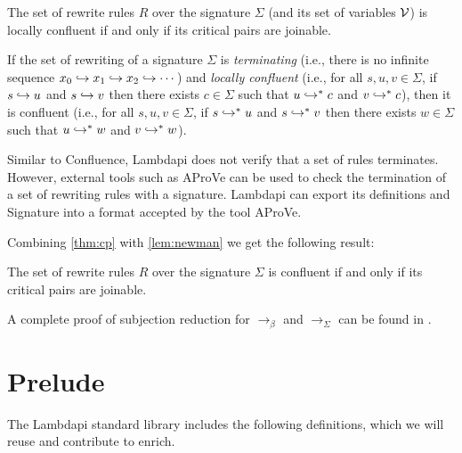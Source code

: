 \begin{theorem}\label{thm:cp}
The set of rewrite rules $R$ over the signature $\Sigma$ (and its set of variables $\cal{V}$) is locally confluent if and only if its critical pairs are joinable.
\end{theorem}


\begin{lemma}\label{lem:newman}
If the set of rewriting of a signature $\Sigma$ is \emph{terminating} (i.e., there is no infinite sequence
$x_0 \re x_1 \re x_2 \re \cdots$) and \emph{locally confluent} (i.e., for all $s,u,v \in \Sigma$, if $s \re u$ and $s \re v$ then there exists
$c \in \Sigma$ such that $u \re^{*} c$ and $v \re^{*} c$), then it is confluent (i.e., for all $s,u,v \in \Sigma$, if $s \re^{*} u$ and
$s \re^{*} v$ then there exists $w \in \Sigma$ such that $u \re^{*} w$ and $v \re^{*} w$).
\end{lemma}

\begin{remark}
Similar to Confluence, Lambdapi does not verify that a set of rules terminates.
However, external tools such as AProVe \cite{aprove} can be used to check the termination of a set of rewriting rules with a signature.
Lambdapi can export its definitions and Signature into a format accepted by the tool AProVe.
\end{remark}

Combining \cref{thm:cp} with \cref{lem:newman} we get the following result:

\begin{corollary}
The set of rewrite rules $R$ over the signature $\Sigma$ is confluent if and only if its critical pairs are joinable.
\end{corollary}

A complete proof of subjection reduction for $\longrightarrow_\beta$ and $\longrightarrow_\Sigma$ can be found in \cite[\S 2.6.4]{Dedukti-ref2}.

\section{Prelude}
\label{sec:prelude-lp}

The Lambdapi standard library includes the following definitions, which we will reuse and contribute to enrich.

